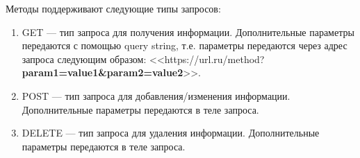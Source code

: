 \documentclass{../includes/TechDoc}
\begin{document}
    Методы поддерживают следующие типы запросов:
    \begin{enumerate}
        \item GET — тип запроса для получения информации.
        Дополнительные параметры передаются с помощью query string, т.е. параметры передаются через адрес запроса
        следующим образом: <<https://url.ru/method?\textbf{param1=value1&param2=value2}>>.
        \item POST — тип запроса для добавления/изменения информации.
        Дополнительные параметры передаются в теле запроса.
        \item DELETE — тип запроса для удаления информации.
        Дополнительные параметры передаются в теле запроса.
    \end{enumerate}\\
\end{document}
